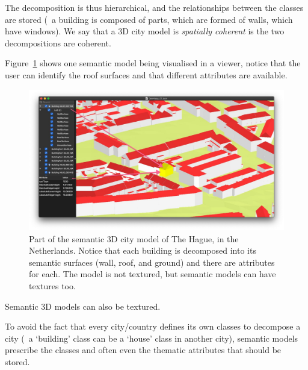 The decomposition is thus hierarchical, and the relationships between the classes are stored (\eg\ a building is composed of parts, which are formed of walls, which have windows). 
We say that a 3D city model is \emph{spatially coherent} is the two decompositions are coherent.

%

Figure~\ref{fig:denhaag} shows one semantic model being visualised in a viewer, notice that the user can identify the roof surfaces and that different attributes are available.
\begin{figure}
  \centering
  \includegraphics[width=\linewidth]{figs/denhaag.jpg}
  \caption{Part of the semantic 3D city model of The Hague, in the Netherlands. Notice that each building is decomposed into its semantic surfaces (wall, roof, and ground) and there are attributes for each. The model is not textured, but semantic models can have textures too.}%
\label{fig:denhaag}
\end{figure}
Semantic 3D models can also be textured.

%

To avoid the fact that every city/country defines its own classes to decompose a city (\eg\ a `building' class can be a `house' class in another city), semantic models prescribe the classes and often even the thematic attributes that should be stored.




